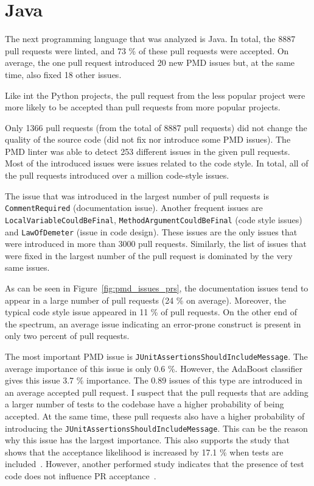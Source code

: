 \documentclass[digital,oneside,oldtable,nolof,nolot,nocover]{fithesis4}
\begin{document}
\section{Java}
\label{sec:orgf7ad933}
The next programming language that was analyzed is Java. In total, the 8887
pull requests were linted, and 73 \% of these pull requests were accepted.
On average, the one pull request introduced 20 new PMD issues but,
at the same time, also fixed 18 other issues.

Like int the Python projects, the pull request from the less popular project
were more likely to be accepted than pull requests from more popular projects.

Only 1366 pull requests (from the total of 8887 pull requests) did not change
the quality of the source code (did not fix nor introduce some PMD issues).
The PMD linter was able to detect 253 different issues in the given pull requests.
Most of the introduced issues were issues related to the code style. In total,
all of the pull requests introduced over a million code-style issues.

The issue that was introduced in the largest number of pull requests is
\texttt{CommentRequired} (documentation issue).  Another frequent issues are
\texttt{LocalVariableCouldBeFinal}, \texttt{MethodArgumentCouldBeFinal} (code style issues)
and \texttt{LawOfDemeter} (issue in code design). These issues are the only issues
that were introduced in more than 3000 pull requests. Similarly, the list of issues
that were fixed in the largest number of the pull request is dominated by the
very same issues.

As can be seen in Figure~\ref{fig:pmd_issues_prs}, the documentation issues
tend to appear in a large number of pull requests (24 \% on average). Moreover,
the typical code style issue appeared in 11 \% of pull requests. On the other
end of the spectrum, an average issue indicating an error-prone construct is present in only two
percent of pull requests.

The most important PMD issue is \texttt{JUnitAssertionsShouldIncludeMessage}. The
average importance of this issue is only 0.6 \%. However, the AdaBoost
classifier gives this issue 3.7 \% importance.  The 0.89 issues of this type
are introduced in an average accepted pull request. I suspect that the pull
requests that are adding a larger number of tests to the codebase have a higher
probability of being accepted. At the same time, these pull requests also have a higher probability
of introducing the \texttt{JUnitAssertionsShouldIncludeMessage}. This can be the
reason why this issue has the largest importance.  This also supports the
study that shows that the acceptance likelihood is increased by 17.1 \% when
tests are included~\cite{social}. However, another performed study indicates that
the presence of test code does not influence PR acceptance~\cite{exploratory}.
\end{document}
